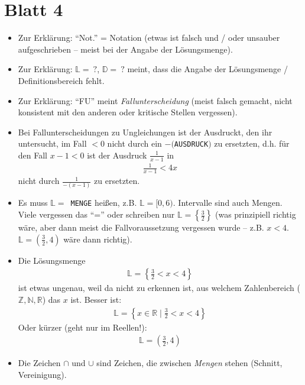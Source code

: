 \documentclass[11pt, a4paper]{article}
\newcommand{\Lsg}{\mathbb{L}}
\newcommand{\R}{\mathbb{R}}
\newcommand{\D}{\mathbb{D}}
\newcommand{\N}{\mathbb{N}}
\newcommand{\Z}{\mathbb{Z}}
\begin{document}
\section*{Blatt 4}
\begin{itemize}
\item Zur Erklärung: \enquote{Not.} = Notation (etwas ist falsch und / oder unsauber aufgeschrieben -- meist bei der Angabe der Lösungsmenge).

\item Zur Erklärung: $\Lsg =~?$, $\D =~?$ meint, dass die Angabe der Lösungsmenge / Definitionsbereich fehlt.

\item Zur Erklärung: \enquote{FU} meint \emph{Fallunterscheidung} (meist falsch gemacht, nicht konsistent mit den anderen oder kritische Stellen vergessen).

\item Bei Fallunterscheidungen zu Ungleichungen ist der Ausdruckt, den ihr untersucht, im Fall $< 0$ nicht durch ein $-($\texttt{AUSDRUCK}$)$ zu ersetzten, d.h. für den Fall $x-1 < 0$ ist der Ausdruck $\frac{1}{x-1}$ in
\begin{align*}
\frac{1}{x-1} < 4x
\end{align*}
nicht durch $\frac{1}{-(x-1)}$ zu ersetzten.


\item Es muss $\Lsg = $~\texttt{MENGE} heißen, z.B. $\Lsg = [0, 6)$. Intervalle sind auch Mengen. Viele vergessen das \enquote{=} oder schreiben nur $\Lsg = \left\{\frac{3}{2}\right\}$ (was prinzipiell richtig wäre, aber dann meist die Fallvoraussetzung vergessen wurde -- z.B. $x < 4$. $\Lsg =\left(\frac{3}{2}, 4\right)$ wäre dann richtig).

\item Die Lösungsmenge 
\begin{align*}
\Lsg =\left\{\frac{3}{2} < x < 4\right\}
\end{align*}
ist etwas ungenau, weil da nicht zu erkennen ist, aus welchem Zahlenbereich ($\Z, \N, \R$) das $x$ ist. Besser ist: 
\begin{align*}
\Lsg =\left\{x \in \R \mid \frac{3}{2} < x < 4\right\}
\end{align*}
Oder kürzer (geht nur im Reellen!):
\begin{align*}
\Lsg =\left(\frac{3}{2}, 4\right)
\end{align*}

\item Die Zeichen $\cap$ und $\cup$ sind Zeichen, die zwischen \emph{Mengen} stehen (Schnitt, Vereinigung). 


\end{itemize}
\end{document}
